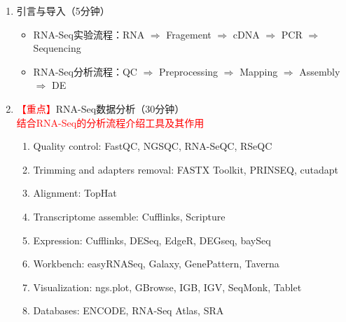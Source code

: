 \documentclass{TIJMUjiaoanLL}
\begin{document}
\begin{enumerate}
  \item 引言与导入（5分钟）
    \begin{itemize}
      \item RNA-Seq实验流程：RNA $\Rightarrow$ Fragement $\Rightarrow$ cDNA $\Rightarrow$ PCR $\Rightarrow$ Sequencing
      \item RNA-Seq分析流程：QC $\Rightarrow$ Preprocessing $\Rightarrow$ Mapping $\Rightarrow$ Assembly $\Rightarrow$ DE
    \end{itemize}

  \item \textcolor{red}{【重点】}RNA-Seq数据分析（30分钟）
    \\ \textcolor{red}{结合RNA-Seq的分析流程介绍工具及其作用}
    \begin{enumerate}
      \item Quality control: FastQC, NGSQC, RNA-SeQC, RSeQC
      \item Trimming and adapters removal: FASTX Toolkit, PRINSEQ, cutadapt
      \item Alignment: TopHat
      \item Transcriptome assemble: Cufflinks, Scripture
      \item Expression: Cufflinks, DESeq, EdgeR, DEGseq, baySeq
      \item Workbench: easyRNASeq, Galaxy, GenePattern, Taverna
      \item Visualization: ngs.plot, GBrowse, IGB, IGV, SeqMonk, Tablet
      \item Databases: ENCODE, RNA-Seq Atlas, SRA
    \end{enumerate}



\end{enumerate}
\end{document}
